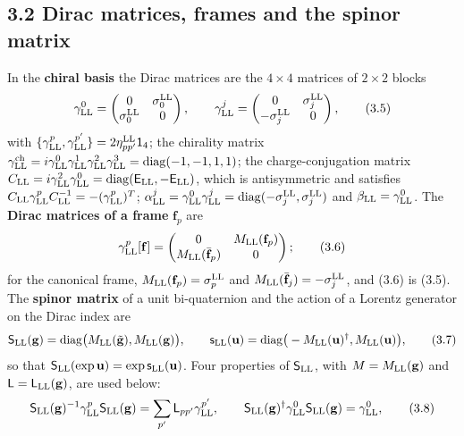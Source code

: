 \documentclass[
  10pt,
]{article}
\begin{document}
\hypertarget{dirac-matrices-frames-and-the-spinor-matrix}{%
\subsection{3.2 Dirac matrices, frames and the spinor
matrix}\label{dirac-matrices-frames-and-the-spinor-matrix}}

In the \textbf{chiral basis} the Dirac matrices are the \(4\times4\)
matrices of \(2\times2\) blocks
\[\gamma^0_{\rm LL}=\begin{pmatrix}0&\sigma^{\rm LL}_0\\\sigma^{\rm LL}_0&0\end{pmatrix},\qquad\gamma^j_{\rm LL}=\begin{pmatrix}0&\sigma^{\rm LL}_j\\-\sigma^{\rm LL}_j&0\end{pmatrix},\tag{3.5}\]
with
\(\{\gamma^p_{\rm LL},\gamma^{p'}_{\rm LL}\}=2\eta^{\rm LL}_{pp'}\mathsf 1_4\);
the chirality matrix
\(\gamma^{\rm ch}_{\rm LL}=i\gamma^0_{\rm LL}\gamma^1_{\rm LL}\gamma^2_{\rm LL}\gamma^3_{\rm LL}=\mathrm{diag}(-1,-1,1,1)\);
the charge-conjugation matrix
\(C_{\rm LL}=i\gamma^2_{\rm LL}\gamma^0_{\rm LL}=\mathrm{diag}(\mathsf E_{\rm LL},-\mathsf E_{\rm LL})\),
which is antisymmetric and satisfies
\(C_{\rm LL}\gamma^p_{\rm LL}C_{\rm LL}^{-1}=-(\gamma^p_{\rm LL})^T\);
\(\alpha^j_{\rm LL}=\gamma^0_{\rm LL}\gamma^j_{\rm LL}=\mathrm{diag}(-\sigma^{\rm LL}_j,\sigma^{\rm LL}_j)\)
and \(\beta_{\rm LL}=\gamma^0_{\rm LL}\). The \textbf{Dirac matrices of
a frame} \(\mathbf f_p\) are
\[\gamma^p_{\rm LL}[\mathbf f]=\begin{pmatrix}0&M_{\rm LL}(\mathbf f_p)\\M_{\rm LL}(\bar{\mathbf f}_p)&0\end{pmatrix};\tag{3.6}\]
for the canonical frame, \(M_{\rm LL}(\mathbf f_p)=\sigma^{\rm LL}_p\)
and \(M_{\rm LL}(\bar{\mathbf f}_j)=-\sigma^{\rm LL}_j\), and (3.6) is
(3.5). The \textbf{spinor matrix} of a unit bi-quaternion and the action
of a Lorentz generator on the Dirac index are
\[\mathsf S_{\rm LL}(\mathbf g)=\mathrm{diag}\big(M_{\rm LL}(\tilde{\mathbf g}),M_{\rm LL}(\mathbf g)\big),\qquad\mathsf s_{\rm LL}(\mathbf u)=\mathrm{diag}\big(-M_{\rm LL}(\mathbf u)^\dagger,M_{\rm LL}(\mathbf u)\big),\tag{3.7}\]
so that
\(\mathsf S_{\rm LL}(\exp\mathbf u)=\exp\mathsf s_{\rm LL}(\mathbf u)\).
Four properties of \(\mathsf S_{\rm LL}\), with
\(M=M_{\rm LL}(\mathbf g)\) and
\(\mathsf L=\mathsf L_{\rm LL}(\mathbf g)\), are used below:
\[\mathsf S_{\rm LL}(\mathbf g)^{-1}\gamma^p_{\rm LL}\mathsf S_{\rm LL}(\mathbf g)=\sum_{p'}\mathsf L_{pp'}\gamma^{p'}_{\rm LL},\qquad\mathsf S_{\rm LL}(\mathbf g)^\dagger\gamma^0_{\rm LL}\mathsf S_{\rm LL}(\mathbf g)=\gamma^0_{\rm LL},\tag{3.8}\]
\end{document}
